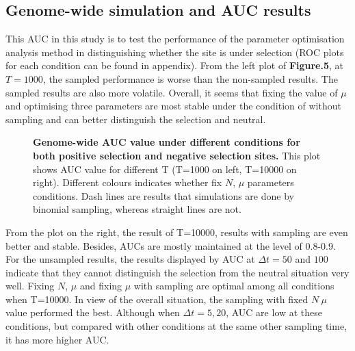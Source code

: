 \documentclass[12pt]{article}
\begin{document}
\subsection{Genome-wide simulation and AUC results}
This AUC in this study is to test the performance of the parameter optimisation analysis method in distinguishing whether the site is under selection (ROC plots for each condition can be found in appendix). From the left plot of \textbf{Figure.5}, at $T=1000$, the sampled performance is worse than the non-sampled results. The sampled results are also more volatile. Overall, it seems that fixing the value of $\mu$ and optimising three parameters are most stable under the condition of without sampling and can better distinguish the selection and neutral.
\begin{figure}[H]
    \centering
    \hspace{-1cm}
    \caption{\textbf{Genome-wide AUC value under different conditions for both positive selection and negative selection sites.} This plot shows AUC value for different T (T=1000 on left, T=10000 on right). Different colours indicates whether fix $N$, $\mu$ parameters conditions. Dash lines are results that simulations are done by binomial sampling, whereas straight lines are not.}
    \label{fig:AUC_value}
\end{figure}
 From the plot on the right, the result of T=10000, results with sampling are even better and stable. Besides, AUCs are mostly maintained at the level of 0.8-0.9. For the unsampled results, the results displayed by AUC at $\Delta t=50$ and $100$ indicate that they cannot distinguish the selection from the neutral situation very well. Fixing $N$, $\mu$ and fixing $\mu$ with sampling are optimal among all conditions when T=10000. In view of the overall situation, the sampling with fixed $N\ \mu$ value performed the best. Although when $\Delta t=5,20$, AUC are low at these conditions, but compared with other conditions at the same other sampling time, it has more higher AUC.\\
\end{document}
